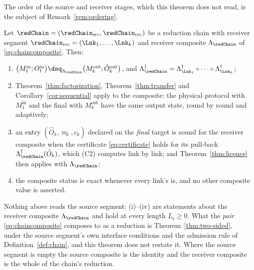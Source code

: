 
The order of the source and receiver stages, which this theorem does not
read, is the subject of Remark~\ref{rem:ordering}.

\begin{theorem}\label{thm:chain}
Let $\redChain=(\redChain_{\mathrm{src}},\redChain_{\mathrm{rec}})$ be a
reduction chain with receiver segment
$\redChain_{\mathrm{rec}}=(\Lnk_1,\dots,\Lnk_k)$ and receiver composite
$\Lambda_{\redChain}$ of \eqref{eq:chaincomposite}. Then:
\begin{enumerate}[label=(\roman*),leftmargin=3.0em]
\item $\big(M^{\mathrm{in}}_1;O^{\mathrm{in}}_1\big)
  \dsq_{\Lambda_{\redChain}}
  \big(M^{\mathrm{out}}_k;\hat O^{\mathrm{out}}_k\big)$, and
  $\Lambda_{\redChain}^{\dagger}
  =\Lambda_{\Lnk_1}^{\dagger}\circ\dots\circ\Lambda_{\Lnk_k}^{\dagger}$;
\item Theorem~\ref{thm:factorization}, Theorem~\ref{thm:transfer} and
  Corollary~\ref{cor:sequential} apply to the composite: the physical protocol
  with $M^{\mathrm{in}}_1$ and the final  with
  $M^{\mathrm{out}}_k$ have the same output state, round by round and
  adaptively;
\item an entry $(\hat O_k,\bowtie_k,c_k)$ declared on the \emph{final} target
  is sound for the receiver composite when the certificate
  \eqref{eq:certificate} holds for its pull-back
  $\Lambda_{\redChain}^{\dagger}(\hat O_k)$, which (C2) computes link by link; and
  Theorem~\ref{thm:licence} then applies with $\Lambda_{\redChain}$;
\item the composite status is \textsf{exact} whenever every link's is, and no
  other composite value is asserted.
\end{enumerate}
Nothing above reads the source segment: (i)--(iv) are statements about the
receiver composite $\Lambda_{\redChain}$ and hold at every length
$L_{\mathrm s}\ge0$. What the \emph{pair} \eqref{eq:chaincomposite} composes to
as a reduction is Theorem~\ref{thm:two-sided}, under the source segment's own
interface conditions and the admission rule of Definition~\ref{def:chain}, and
this theorem does not restate it. Where the source segment is empty the source
composite is the identity and the receiver composite is the whole of the
chain's reduction.
\end{theorem}

